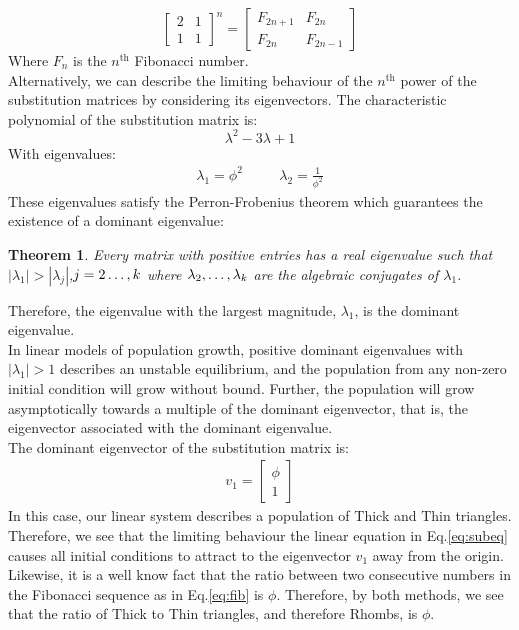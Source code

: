 \documentclass[
  oneside,
  11pt, a4paper,
  footinclude=true,
  headinclude=true,
  cleardoublepage=empty
]{scrbook}
\newtheorem{mythm}{Theorem}
\begin{document}
\begin{equation}
\begin{bmatrix}
2 & 1 \\
1 & 1
\end{bmatrix}^n= 
\begin{bmatrix}
F_{2n+1} & F_{2n} \\
F_{2n} & F_{2n-1}
\end{bmatrix}
\label{eq:fib}
\end{equation}
Where $F_n$ is the $n^{\text{th}}$ Fibonacci number.\\
Alternatively, we can describe the limiting behaviour of the $n^{\text{th}}$ power of the substitution matrices by considering its eigenvectors. The characteristic polynomial of the substitution matrix is:
\begin{equation}
\lambda^2-3\lambda+1
\end{equation}
With eigenvalues:
\begin{align}
\lambda_1=\phi^2 &\quad
&\lambda_2=\frac{1}{\phi^2}
\end{align}
These eigenvalues satisfy the Perron-Frobenius theorem which guarantees the existence of a dominant eigenvalue:

\begin{mythm}
Every matrix with positive entries has a real eigenvalue such that $|\lambda_1|>|\lambda_j|$,$j=2\mathellipsis,k$ where $\lambda_2,\mathellipsis,\lambda_k$ are the algebraic conjugates of $\lambda_1$.
\end{mythm}
Therefore, the eigenvalue with the largest magnitude, $\lambda_1$, is the dominant eigenvalue. \\
In linear models of population growth, positive dominant eigenvalues with $|\lambda_1|>1$ describes an unstable equilibrium, and the population from any non-zero initial condition will grow without bound. Further, the population will grow asymptotically towards a multiple of the dominant eigenvector, that is, the eigenvector associated with the dominant eigenvalue. \\
The dominant eigenvector of the substitution matrix is:
\begin{align}
v_1= \begin{bmatrix}
\phi \\
1
\end{bmatrix}
\end{align}
In this case, our linear system describes a population of Thick and Thin triangles.\\

Therefore, we see that the limiting behaviour the linear equation in Eq.\ref{eq:subeq} causes all initial conditions to attract to the eigenvector $v_1$ away from the origin. Likewise, it is a well know fact that the ratio between two consecutive numbers in the Fibonacci sequence as in Eq.\ref{eq:fib} is $\phi$. Therefore, by both methods, we see that the ratio of Thick to Thin triangles, and therefore Rhombs, is $\phi$.
\end{document}
